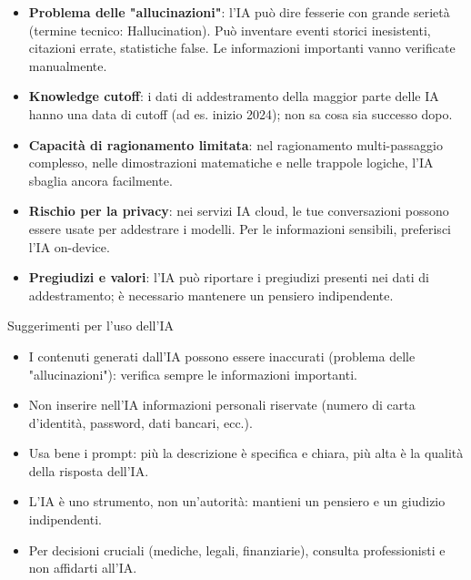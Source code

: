 \begin{itemize}
  \item \textbf{Problema delle "allucinazioni"}: l'IA può dire fesserie con grande serietà (termine tecnico: Hallucination). Può inventare eventi storici inesistenti, citazioni errate, statistiche false. Le informazioni importanti vanno verificate manualmente.
  \item \textbf{Knowledge cutoff}: i dati di addestramento della maggior parte delle IA hanno una data di cutoff (ad es. inizio 2024); non sa cosa sia successo dopo.
  \item \textbf{Capacità di ragionamento limitata}: nel ragionamento multi-passaggio complesso, nelle dimostrazioni matematiche e nelle trappole logiche, l'IA sbaglia ancora facilmente.
  \item \textbf{Rischio per la privacy}: nei servizi IA cloud, le tue conversazioni possono essere usate per addestrare i modelli. Per le informazioni sensibili, preferisci l'IA on-device.
  \item \textbf{Pregiudizi e valori}: l'IA può riportare i pregiudizi presenti nei dati di addestramento; è necessario mantenere un pensiero indipendente.
\end{itemize}

\begin{tcbinfo}{Suggerimenti per l'uso dell'IA}
\begin{itemize}
  \item I contenuti generati dall'IA possono essere inaccurati (problema delle "allucinazioni"): verifica sempre le informazioni importanti.
  \item Non inserire nell'IA informazioni personali riservate (numero di carta d'identità, password, dati bancari, ecc.).
  \item Usa bene i prompt: più la descrizione è specifica e chiara, più alta è la qualità della risposta dell'IA.
  \item L'IA è uno strumento, non un'autorità: mantieni un pensiero e un giudizio indipendenti.
  \item Per decisioni cruciali (mediche, legali, finanziarie), consulta professionisti e non affidarti all'IA.
\end{itemize}

\end{tcbinfo}

